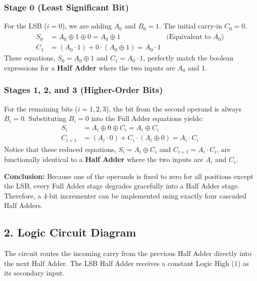 \documentclass[12pt,a3paper]{article}
\begin{document}
\begin{enumerate}
\begin{tcolorbox}[enhanced,breakable,ansbox,colback=cD!4,colframe=cD,boxrule=0.8pt,arc=5pt,title={\textbf{Answer}},fonttitle=\bfseries\color{white},colbacktitle=cD]
\subsubsection*{Stage 0 (Least Significant Bit)}
For the LSB ($i=0$), we are adding $A_0$ and $B_0 = 1$. The initial carry-in $C_0 = 0$.
\begin{align*}
    S_0 &= A_0 \oplus 1 \oplus 0 = A_0 \oplus 1 \quad &\text{(Equivalent to $\overline{A_0}$)} \\
    C_1 &= (A_0 \cdot 1) + 0 \cdot (A_0 \oplus 1) = A_0 \cdot 1
\end{align*}
These equations, $S_0 = A_0 \oplus 1$ and $C_1 = A_0 \cdot 1$, perfectly match the boolean expressions for a \textbf{Half Adder} where the two inputs are $A_0$ and $1$.

\subsubsection*{Stages 1, 2, and 3 (Higher-Order Bits)}
For the remaining bits ($i = 1, 2, 3$), the bit from the second operand is always $B_i = 0$. Substituting $B_i = 0$ into the Full Adder equations yields:
\begin{align*}
    S_i &= A_i \oplus 0 \oplus C_i = A_i \oplus C_i \\
    C_{i+1} &= (A_i \cdot 0) + C_i \cdot (A_i \oplus 0) = A_i \cdot C_i
\end{align*}
Notice that these reduced equations, $S_i = A_i \oplus C_i$ and $C_{i+1} = A_i \cdot C_i$, are functionally identical to a \textbf{Half Adder} where the two inputs are $A_i$ and $C_i$.

\vspace{0.2cm}
\begin{center}
    \textbf{Conclusion:} Because one of the operands is fixed to zero for all positions except the LSB, every Full Adder stage degrades gracefully into a Half Adder stage. Therefore, a 4-bit incrementer can be implemented using exactly four cascaded Half Adders.
\end{center}

\subsection*{2. Logic Circuit Diagram}

The circuit routes the incoming carry from the previous Half Adder directly into the next Half Adder. The LSB Half Adder receives a constant Logic High ($1$) as its secondary input.


\end{tcolorbox}
\end{enumerate}
\end{document}
